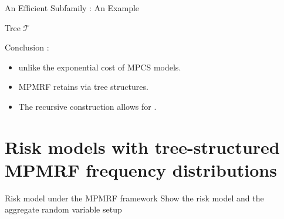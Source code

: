 \documentclass[11pt,xcolor={dvipsnames},hyperref={pdftex,pdfpagemode=UseNone,hidelinks,pdfdisplaydoctitle=true},usepdftitle=false]{beamer}
\begin{document}
\begin{frame}{An Efficient Subfamily : An Example}
\begin{minipage}{0.30\textwidth}
\hspace{-0.6cm} Tree $\mathcal{T}$
\vfill
\end{minipage}
\vfill
\pause
Conclusion : 
\begin{itemize}
    \item {} unlike the exponential cost of MPCS models.
    \item MPMRF retains  via tree structures.
    \item The recursive construction allows for .
\end{itemize}
\end{frame}
   
    

\section{Risk models with tree-structured MPMRF frequency distributions}
\begin{frame}{Risk model under the MPMRF framework}
Show the risk model and the aggregate random variable setup
\end{frame}
\end{document}
